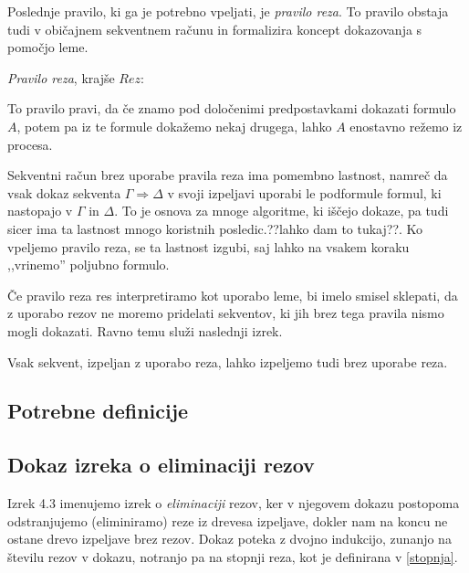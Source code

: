 Poslednje pravilo, ki ga je potrebno vpeljati, je \emph{pravilo reza}. To pravilo obstaja tudi v običajnem sekventnem računu in formalizira koncept dokazovanja s pomočjo leme.

\begin{definicija}
	\emph{Pravilo reza}, krajše $Rez$:
	\begin{prooftree}
	\end{prooftree}
	To pravilo pravi, da če znamo pod določenimi predpostavkami dokazati formulo $A$, potem pa iz te formule dokažemo nekaj drugega, lahko $A$ enostavno režemo iz procesa.
\end{definicija}

\begin{opomba}
    Sekventni račun brez uporabe pravila reza ima pomembno lastnost, namreč da vsak dokaz sekventa $\Gamma \Rightarrow \Delta$ v svoji izpeljavi uporabi le podformule formul, ki nastopajo v $\Gamma$ in $\Delta$. To je osnova za mnoge algoritme, ki iščejo dokaze, pa tudi sicer ima ta lastnost mnogo koristnih posledic.??lahko dam to tukaj??. Ko vpeljemo pravilo reza, se ta lastnost izgubi, saj lahko na vsakem koraku ,,vrinemo'' poljubno formulo.
\end{opomba}

Če pravilo reza res interpretiramo kot uporabo leme, bi imelo smisel sklepati, da z uporabo rezov ne moremo pridelati sekventov, ki jih brez tega pravila nismo mogli dokazati. Ravno temu služi naslednji izrek.

\begin{izrek} \label{izrek}
    Vsak sekvent, izpeljan z uporabo reza, lahko izpeljemo tudi brez uporabe reza.
\end{izrek}

\subsection{Potrebne definicije} \label{defs}


\subsection{Dokaz izreka o eliminaciji rezov} \label{dokaz}

Izrek 4.3 imenujemo izrek o \emph{eliminaciji} rezov, ker v njegovem dokazu postopoma odstranjujemo (eliminiramo) reze iz drevesa izpeljave, dokler nam na koncu ne ostane drevo izpeljave brez rezov. Dokaz poteka z dvojno indukcijo, zunanjo na številu rezov v dokazu, notranjo pa na stopnji reza, kot je definirana v \ref{stopnja}.

